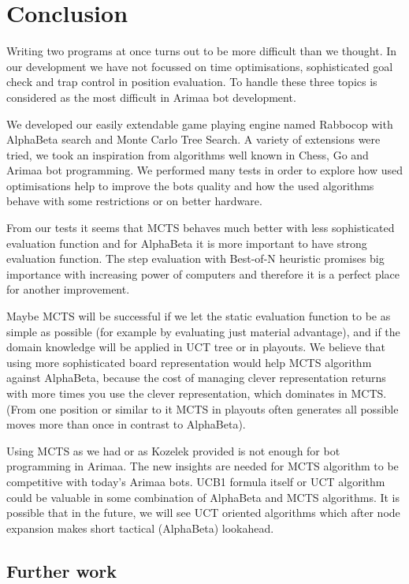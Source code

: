 \chapter{Conclusion}
Writing two programs at once turns out to be more difficult than we thought. In
our development we have not focussed on time optimisations, sophisticated goal
check and trap control in position evaluation. To handle these three topics is
considered as the most difficult in Arimaa bot development.

We developed our easily extendable game playing engine named Rabbocop with
AlphaBeta search and Monte Carlo Tree Search. A variety of extensions were
tried, we took an inspiration from algorithms well known in Chess, Go and
Arimaa bot programming. We performed many tests in order to explore how used
optimisations help to improve the bots quality and how the used algorithms
behave with some restrictions or on better hardware.

From our tests it seems that MCTS behaves much better with less sophisticated
evaluation function and for AlphaBeta it is more important to have strong
evaluation function. The step evaluation with Best-of-N heuristic promises big
importance with increasing power of computers and therefore it is a perfect
place for another improvement.

Maybe MCTS will be successful if we let the static evaluation function to be as
simple as possible (for example by evaluating just material advantage), and if
the domain knowledge will be applied in UCT tree or in playouts. We believe
that using more sophisticated board representation would help MCTS algorithm
against AlphaBeta, because the cost of managing clever representation returns
with more times you use the clever representation, which dominates in MCTS.
(From one position or similar to it MCTS in playouts often generates all
possible moves more than once in contrast to AlphaBeta).

Using MCTS as we had or as Kozelek provided is not enough for bot programming
in Arimaa. The new insights are needed for MCTS algorithm to be competitive
with today's Arimaa bots. UCB1 formula itself or UCT algorithm could be
valuable in some combination of AlphaBeta and MCTS algorithms. It is possible
that in the future, we will see UCT oriented algorithms which after node
expansion makes short tactical (AlphaBeta) lookahead.


\section{Further work}

